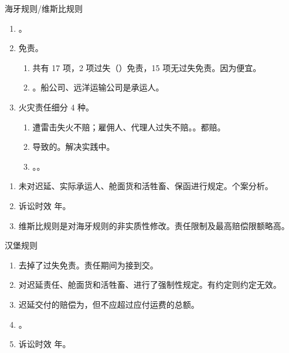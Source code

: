 \begin{enumerate}
\begin{enumerate}
\begin{kk}{海牙规则/维斯比规则}
\begin{enumerate}
                    \item {}。
                    \item 免责。
                          \begin{enumerate}
                            \item 共有 17 项，2 项过失（）免责，15 项无过失免责。因为便宜。
                            \item {}。船公司、远洋运输公司是承运人。
                          \end{enumerate}
                    \item 火灾责任细分 4 种。
                          \begin{enumerate}
                            \item 遭雷击失火不赔；雇佣人、代理人过失不赔。。\xjt 都赔。
                            \item {}导致的。解决实践中。
                            \item {}。。
                          \end{enumerate}
                  \end{enumerate}
                  \tcblower
                  \begin{enumerate}
                    \item 未对迟延、实际承运人、舱面货和活牲畜、保函进行规定。个案分析。
                    \item 诉讼时效  年。
                    \item 维斯比规则是对海牙规则的非实质性修改。责任限制及最高赔偿限额略高。
                  \end{enumerate}
                \end{kk}

                \begin{kk}{汉堡规则}
                  \begin{enumerate}
                    \item 去掉了过失免责。责任期间为接到交。
                    \item 对迟延责任、舱面货和活牲畜、进行了强制性规定。有约定则约定无效。
                    \item 迟延交付的赔偿为，但不应超过应付运费的总额。
                    \item {}。
                    \item 诉讼时效  年。
                  \end{enumerate}


\end{kk}
\end{enumerate}
\end{enumerate}
